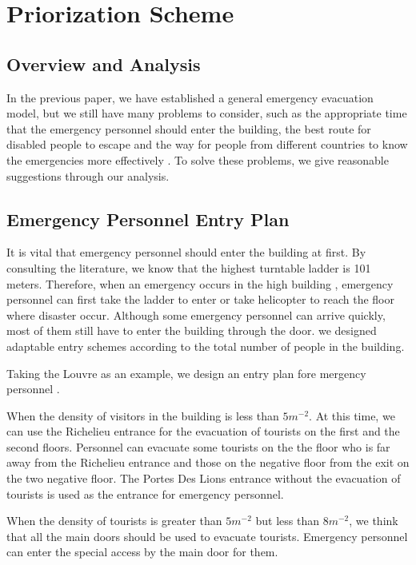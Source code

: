 \section{Priorization Scheme}

\subsection{Overview and Analysis}
In the previous paper, we have established a general emergency evacuation model, but we still have many problems to consider, such as the appropriate time that the emergency personnel should enter the building, the best route for disabled people to escape and the way for people from different countries to know the emergencies more effectively . To solve these problems, we give reasonable suggestions through our analysis.
\subsection{Emergency Personnel Entry Plan}
It is vital that emergency personnel should enter the building at first. By consulting the literature, we know that the highest turntable ladder is 101 meters. Therefore, when an emergency occurs in the high building , emergency personnel can first take the ladder to enter or take helicopter to reach the floor where disaster occur. Although some emergency personnel can arrive quickly, most of them still have to enter the building through the door.  we designed adaptable entry schemes according to the total number of people in the building.

Taking the Louvre as an example, we design an entry plan fore mergency personnel .

When the density of visitors in the building is less than $5m^{-2}$. At this time, we can use the Richelieu entrance for the evacuation of tourists on the first and the second floors. Personnel can evacuate some tourists on the the floor who is far away from the Richelieu entrance and those on the negative floor from the exit on the two negative floor. The Portes Des Lions entrance without the evacuation of tourists is used as the entrance for emergency personnel.

When the density of tourists is greater than $5m^{-2}$ but less than $8m^{-2}$, we think that all the main doors should be used to evacuate tourists. Emergency personnel can enter the special access by the main door for them.

